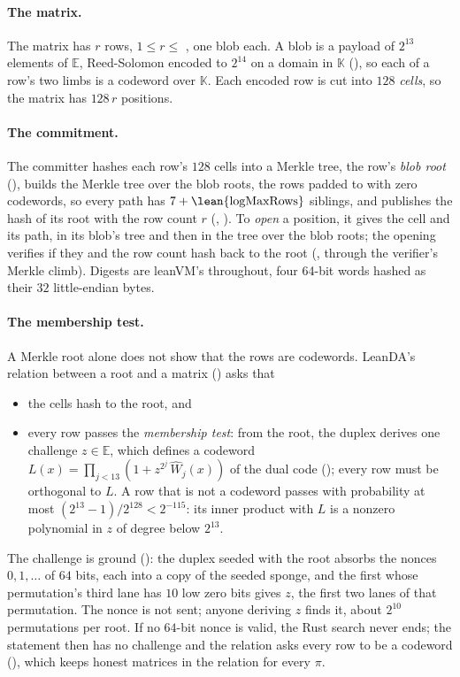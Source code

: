 \documentclass[11pt]{article}
\begin{document}
\paragraph{The matrix.} The matrix has $r$ rows, $1 \le r \le$ , one blob each. A blob is a
payload of $2^{13}$ elements of $\mathbb{E}$, Reed-Solomon encoded to $2^{14}$ on a domain in
$\mathbb{K}$ (), so each of a row's two limbs is a codeword over $\mathbb{K}$. Each encoded row is cut into $128$ \emph{cells}, so the matrix has
$128\,r$ positions.

\paragraph{The commitment.} The committer hashes each row's $128$ cells into a Merkle tree, the
row's \emph{blob root} (), builds the Merkle tree over the blob roots, the rows
padded to  with zero codewords, so every path has $7 + \mbox{\lean{logMaxRows}}$
siblings, and publishes the hash of its root with the row count $r$ (,
). To \emph{open} a position, it gives the cell and its path, in its blob's tree
and then in the tree over the blob roots; the opening verifies if they and the row count hash back
to the root (, through the verifier's Merkle climb). Digests are leanVM's throughout, four 64-bit words hashed as their $32$ little-endian bytes.

\paragraph{The membership test.} A Merkle root alone does not show that the rows
are codewords. LeanDA's relation between a root and a matrix () asks that
\begin{itemize}
\item the cells hash to the root, and
\item every row passes the \emph{membership test}: from the root, the duplex derives one
challenge $z \in \mathbb{E}$, which defines a codeword $L(x) = \prod_{j<13} (1 + z^{2^j}\,\widehat{W}_j(x))$ of the
dual code (); every row must be orthogonal to $L$. A row that is not a codeword
passes with probability at most $(2^{13}-1)/2^{128} < 2^{-115}$: its inner product with $L$ is a
nonzero polynomial in $z$ of degree below $2^{13}$.
\end{itemize}
The challenge is ground (): the duplex seeded with the root absorbs
the nonces $0, 1, \dots$ of $64$ bits, each into a copy of the seeded sponge, and the first whose
permutation's third lane has $10$ low zero bits gives $z$, the first two lanes of that permutation.
The nonce is not sent; anyone deriving $z$ finds it, about $2^{10}$ permutations per root. If no
$64$-bit nonce is valid, the Rust search never ends; the statement then has no challenge and the
relation asks every row to be a codeword (), which keeps honest matrices
in the relation for every $\pi$.
\end{document}
